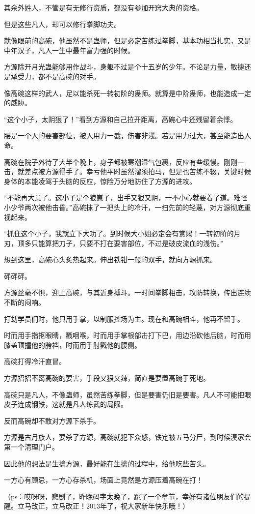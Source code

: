 \begin{this_body}
其余外姓人，不管是有无修行资质，都没有参加开窍大典的资格。

但是这些凡人，却可以修行拳脚功夫。

就像眼前的高碗，他虽然不是蛊师，但是必定苦练过拳脚，基本功相当扎实，又是中年汉子，凡人一生中最年富力强的时候。

方源除开月光蛊能够用作战斗，身躯不过是个十五岁的少年。不论是力量，敏捷还是承受力，都不是高碗的对手。

像高碗这样的武人，足以能杀死一转初阶的蛊师。就算是中阶蛊师，也能造成一定的威胁。

“这个小子，太阴狠了！”看到方源和自己拉开距离，高碗心中还残留着余悸。

腰是一个人的要害部位，被人用力一戳，伤害非浅。若是用力过大，甚至能造出人命。

高碗在院子外待了大半个晚上，身子都被寒潮湿气包裹，反应有些缓慢。刚刚一击，就差点被方源得手了。幸亏他平时虽然溜须拍马，但是也苦练不辍，关键时候身体的本能凌驾于头脑的反应，惊险万分地防住了方源的进攻。

“不能再大意了。这小子是个狼崽子，出手又狠又阴，一不小心就要着了道。难怪小少爷两次被他击昏。”高碗抹了一把头上的冷汗，一扫先前的轻蔑，对方源彻底重视起来。

“抓住这个小子，我就立下大功了。到时候大小姐必定会有赏赐！一转初阶的月刃，顶多只能算把刀子，只要不打在要害部位，不过是破皮流血的浅伤。”

想到这里，高碗心头炙热起来。伸出铁钳一般的双手，就向方源抓来。

砰砰砰。

方源丝毫不惧，迎上高碗，与其近身搏斗。一时间拳脚相击，攻防转换，传出连续不断的闷响。

打劫学员们时，他只用手掌，以制服控场为主。现在和高碗相斗，他再不留手。

时而用手指抠眼睛，戳咽喉，时而用手掌根部击打下巴，用边沿砍他后脑，时而用膝盖顶撞他的胯裆，时而用手肘戳他的腰侧。

高碗打得冷汗直冒。

方源招招不离高碗的要害，手段又狠又辣，简直是要置高碗于死地。

高碗只是凡人，不像蛊师，虽然苦练拳脚，但是要害仍旧是要害。凡人不可能把眼皮子连成钢铁，这就是凡人练武的局限。

反而高碗却不敢对方源下杀手。

方源是古月族人，要杀了方源，高碗就犯下众怒，铁定被五马分尸，到时候漠家会第一个清理门户。

因此他的想法是生擒方源，最好能在生擒的过程中，给他吃些苦头。

一方心有顾忌，一方心存杀机，场面上竟然是方源压着高碗在打！

（ps：哎呀呀，悲剧了，昨晚码字太晚了，跳了一个章节，幸好有诸位朋友们的提醒。立马改正，立马改正！2013年了，祝大家新年快乐哦！）

\end{this_body}

